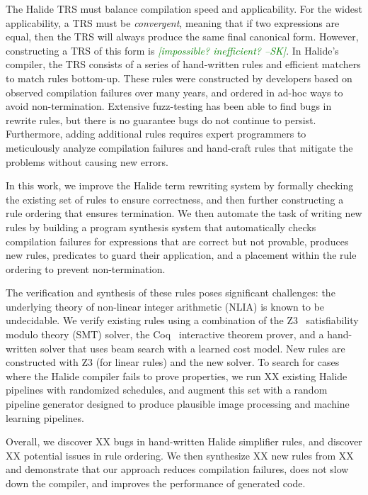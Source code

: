 \documentclass[sigplan,review,anonymous]{acmart}\settopmatter{printfolios=true,printccs=false,printacmref=false}
\newcommand{\sak}[1]{\textcolor{green}{\textit{[{#1} --SK]}}}
\newcommand{\NumApps}{{\color{red} XX}\xspace}
\newcommand{\NumRulesFixed}{{\color{red} XX}\xspace}
\newcommand{\NumOrderingProblems}{{\color{red} XX}\xspace}
\newcommand{\NumRulesSynthesized}{{\color{red} XX}\xspace}
\newcommand{\NumFailureExamples}{{\color{red} XX}\xspace}
\begin{document}
The Halide TRS must balance compilation speed and applicability.  For the widest applicability,
a TRS must be \textit{convergent}, meaning that if two expressions are equal, then the TRS
will always produce the same final canonical form.  However, constructing a TRS of this form
is \sak{impossible? inefficient?}.  In Halide's compiler, the TRS consists of a series of
hand-written rules and efficient matchers to match rules bottom-up.  These rules were constructed
by developers based on observed compilation failures over many years, and ordered in ad-hoc ways
to avoid non-termination.  Extensive fuzz-testing has been able to find bugs in rewrite rules,
but there is no guarantee bugs do not continue to persist.  Furthermore, adding additional
rules requires expert programmers to meticulously analyze compilation failures and hand-craft
rules that mitigate the problems without causing new errors.

In this work, we improve the Halide term rewriting system by  formally checking the existing
set of rules to ensure correctness, and then further constructing a rule ordering that 
ensures termination.  We then automate the task of writing new rules by building a program
synthesis system that automatically checks compilation failures for expressions that are
correct but not provable, produces new rules, predicates to guard their application, and
a placement within the rule ordering to prevent non-termination.

The verification and synthesis
of these rules poses significant challenges: the underlying theory of non-linear integer arithmetic (NLIA)
is known to be undecidable.  We verify existing rules using a combination of the Z3~\cite{de2008z3} satisfiability
modulo theory (SMT) solver, the Coq~\cite{coq19} interactive theorem prover, and a hand-written solver
that uses beam search with a learned cost model.  New rules are constructed with Z3 (for linear rules)
and the new solver.  To search for cases where the Halide compiler fails to prove properties, we run
\NumApps existing Halide pipelines with randomized schedules, and augment this set with a random pipeline
generator designed to produce plausible image processing and machine learning pipelines.

Overall, we discover \NumRulesFixed bugs in hand-written Halide simplifier rules, and discover \NumOrderingProblems
potential issues in rule ordering.  We then synthesize \NumRulesSynthesized new rules from \NumFailureExamples and
demonstrate that our approach reduces compilation failures, does not slow down the compiler, and improves
the performance of generated code.
\end{document}
